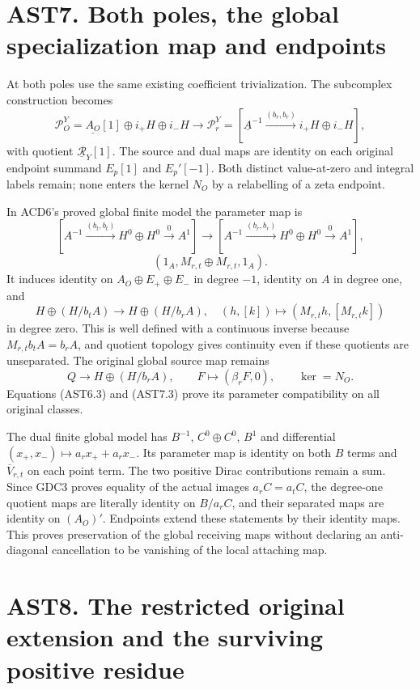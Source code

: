 \section{AST7. Both poles, the global specialization map and
endpoints}\label{ast7.-both-poles-the-global-specialization-map-and-endpoints}

At both poles use the same existing coefficient trivialization. The
subcomplex construction becomes \[
\mathscr P_O^Y=\underline{A_O}[1]\oplus i_+H\oplus i_-H
\longrightarrow
\mathscr P_r^Y=[\underline A^{-1}\xrightarrow{(b_r,b_r)}i_+H\oplus i_-H],
\tag{AST7.1}
\] with quotient \(\underline{\mathcal R}_Y[1]\). The source and dual
maps are identity on each original endpoint summand \(E_p[1]\) and
\(E_p'[-1]\). Both distinct value-at-zero and integral labels remain;
none enters the kernel \(N_O\) by a relabelling of a zeta endpoint.

In ACD6's proved global finite model the parameter map is \[
[A^{-1}\xrightarrow{(b_t,b_t)}H^0\oplus H^0\xrightarrow0A^1]
\longrightarrow
[A^{-1}\xrightarrow{(b_r,b_r)}H^0\oplus H^0\xrightarrow0A^1],
\] \[
(1_A,M_{r,t}\oplus M_{r,t},1_A).
\tag{AST7.2}
\] It induces identity on \(A_O\oplus E_+\oplus E_-\) in degree \(-1\),
identity on \(A\) in degree one, and \[
H\oplus(H/b_tA)\longrightarrow H\oplus(H/b_rA),
\quad(h,[k])\longmapsto(M_{r,t}h,[M_{r,t}k])
\tag{AST7.3}
\] in degree zero. This is well defined with a continuous inverse
because \(M_{r,t}b_tA=b_rA\), and quotient topology gives continuity
even if these quotients are unseparated. The original global source map
remains \[
Q\longrightarrow H\oplus(H/b_rA),\qquad
F\longmapsto(\beta_rF,0),\qquad \ker=N_O.
\tag{AST7.4}
\] Equations (AST6.3) and (AST7.3) prove its parameter compatibility on
all original classes.

The dual finite global model has \(B^{-1}\), \(C^0\oplus C^0\), \(B^1\)
and differential \((x_+,x_-)\mapsto a_rx_++a_rx_-\). Its parameter map
is identity on both \(B\) terms and \(\overline V_{r,t}\) on each point
term. The two positive Dirac contributions remain a sum. Since GDC3
proves equality of the actual images \(a_rC=a_tC\), the degree-one
quotient maps are literally identity on \(B/a_rC\), and their separated
maps are identity on \((A_O)'\). Endpoints extend these statements by
their identity maps. This proves preservation of the global receiving
maps without declaring an anti-diagonal cancellation to be vanishing of
the local attaching map.

\section{AST8. The restricted original extension and the surviving
positive
residue}\label{ast8.-the-restricted-original-extension-and-the-surviving-positive-residue}

